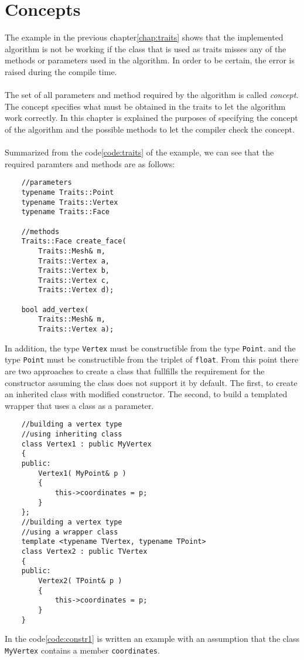 \chapter{Concepts}

The example in the previous chapter\ref{chap:traits} shows that the implemented algorithm
is not be working if the class that is used as traits misses any of the methods or parameters
used in the algorithm. In order to be certain, the error is raised during the compile time.\\
\\
The set of all parameters and method required by the algorithm is called \emph{concept}.
The concept specifies what must be obtained in the traits to let the algorithm work correctly.
In this chapter is explained the purposes of specifying the concept of the algorithm and the
possible methods to let the compiler check the concept.\\
\\
Summarized from the code\ref{code:traits} of the example, we can see that the required
paramters and methods are as follows:

\begin{lstlisting}
	//parameters
	typename Traits::Point
	typename Traits::Vertex
	typename Traits::Face
	
	//methods
	Traits::Face create_face(
		Traits::Mesh& m,
		Traits::Vertex a,
		Traits::Vertex b,
		Traits::Vertex c,
		Traits::Vertex d);

	bool add_vertex(
		Traits::Mesh& m,
		Traits::Vertex a);
\end{lstlisting}
In addition, the type \texttt{Vertex} must be constructible from the type \texttt{Point}.
and the type \texttt{Point} must be constructible from the triplet of \texttt{float}.
From this point there are two approaches to create a class that fullfills the requirement
for the constructor assuming the class does not support it by default.
The first, to create an inherited class with modified constructor. The second,
to build a templated wrapper that uses a class as a parameter.
\label{code:constr1}
\begin{lstlisting}
	//building a vertex type
	//using inheriting class
	class Vertex1 : public MyVertex
	{
	public:
		Vertex1( MyPoint& p )
		{
			this->coordinates = p;
		}
	};
	//building a vertex type
	//using a wrapper class
	template <typename TVertex, typename TPoint>
	class Vertex2 : public TVertex
	{
	public:
		Vertex2( TPoint& p )
		{
			this->coordinates = p;
		}
	}
\end{lstlisting}
In the code\ref{code:constr1} is written an example with an assumption that the class \texttt{MyVertex}
contains a member \texttt{coordinates}.